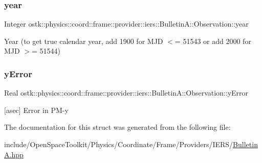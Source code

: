 \subsubsection{\texorpdfstring{year}{year}}
{\footnotesize\ttfamily Integer ostk\+::physics\+::coord\+::frame\+::provider\+::iers\+::\+Bulletin\+A\+::\+Observation\+::year}



Year (to get true calendar year, add 1900 for M\+JD $<$= 51543 or add 2000 for M\+JD $>$= 51544) 

\mbox{\label{structostk_1_1physics_1_1coord_1_1frame_1_1provider_1_1iers_1_1_bulletin_a_1_1_observation_a1dd5c9292450189cb83261201a76efe8}} 
\subsubsection{\texorpdfstring{y\+Error}{yError}}
{\footnotesize\ttfamily Real ostk\+::physics\+::coord\+::frame\+::provider\+::iers\+::\+Bulletin\+A\+::\+Observation\+::y\+Error}



\mbox{[}asec\mbox{]} Error in P\+M-\/y 



The documentation for this struct was generated from the following file\+:\begin{DoxyCompactItemize}
\item 
include/\+Open\+Space\+Toolkit/\+Physics/\+Coordinate/\+Frame/\+Providers/\+I\+E\+R\+S/\hyperlink{_bulletin_a_8hpp}{Bulletin\+A.\+hpp}\end{DoxyCompactItemize}
